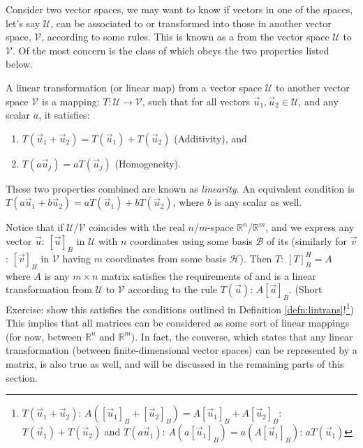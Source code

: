 Consider two vector spaces, we may want to know if vectors in one of the spaces, let's say $\mathcal{U}$, can be associated to or transformed into those in another vector space, $\mathcal{V}$, according to some rules. This is known as a  from the vector space $\mathcal{U}$ to $\mathcal{V}$. Of the most concern is the class of  which obeys the two properties listed below.
\begin{defn}
\label{defn:lintrans}
A linear transformation (or linear map) from a vector space $\mathcal{U}$ to another vector space $\mathcal{V}$ is a mapping: $T: \mathcal{U} \to \mathcal{V}$, such that for all vectors $\vec{u}_1, \vec{u}_2 \in \mathcal{U}$, and any scalar $a$, it satisfies:
\begin{enumerate}
    \item $T(\vec{u}_1 + \vec{u}_2) = T(\vec{u}_1) + T(\vec{u}_2)$ (Additivity), and
    \item $T(a\vec{u}_j) = aT(\vec{u}_j)$ (Homogeneity).
\end{enumerate}
These two properties combined are known as \textit{linearity}. An equivalent condition is $T(a\vec{u}_1 + b\vec{u}_2) = aT(\vec{u}_1) + bT(\vec{u}_2)$, where $b$ is any scalar as well.
\end{defn}
Notice that if $\mathcal{U}$/$\mathcal{V}$ coincides with the real $n$/$m$-space $\mathbb{R}^n$/$\mathbb{R}^m$, and we express any vector $\vec{u}$: $[\vec{u}]_B$ in $\mathcal{U}$ with $n$ coordinates using some basis $\mathcal{B}$ of its (similarly for $\vec{v}$: $ [\vec{v}]_{H}$ in $\mathcal{V}$ having $m$ coordinates from some basis $\mathcal{H}$). Then $T$: $[T]_B^{H} = A$ where $A$ is any $m \times n$ matrix satisfies the requirements of and is a linear transformation from $\mathcal{U}$ to $\mathcal{V}$ according to the rule $T(\vec{u})$: $A[\vec{u}]_B$. (Short Exercise: show this satisfies the conditions outlined in Definition \ref{defn:lintrans}!\footnote{$T(\vec{u}_1+\vec{u}_2)$: $A([\vec{u}_1]_B + [\vec{u}_2]_B) = A[\vec{u}_1]_B + A[\vec{u}_2]_B$: $T(\vec{u}_1)+T(\vec{u}_2)$ and $T(a\vec{u}_1)$: $A(a[\vec{u}_1]_B) = a(A[\vec{u}_1]_B)$: $aT(\vec{u}_1)$}) This implies that all matrices can be considered as some sort of linear mappings (for now, between $\mathbb{R}^n$ and $\mathbb{R}^m$). In fact, the converse, which states that any linear transformation (between finite-dimensional vector spaces) can be represented by a matrix, is also true as well, and will be discussed in the remaining parts of this section.\\
